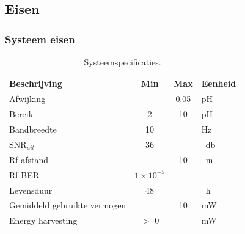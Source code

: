 \subsection*{Eisen}
\begin{frame}
    \frametitle{Systeem eisen}

    \begin{table}[ht]
        \centering
        \begin{tabular}{|l|c c|l|}
            \hline
            Beschrijving                    & Min               & Max   & Eenheid           \\
            \hline 
            Afwijking                       &                   & 0.05  & pH                \\ 
            Bereik                          & 2                 & 10    & pH                \\
            Bandbreedte                     & 10                &       & Hz                \\
            $\mathrm{SNR}_{uit}$            & 36                &       & \qty{}{\decibel}  \\
            Rf afstand                      &                   & 10    & \qty{}{\meter}    \\
            Rf BER                          & $1\times10^{-5}$  &       &                   \\
            Levensduur                      & 48                &       & \qty{}{\hour}     \\
            Gemiddeld gebruikte vermogen    &                   & 10    & mW                \\
            Energy harvesting               & $>$ 0             &       & mW                \\
            \hline
        \end{tabular}
        \caption{Systeemspecificaties.}
        \label{tab:systemSpecs}
    \end{table}

\end{frame}
    
